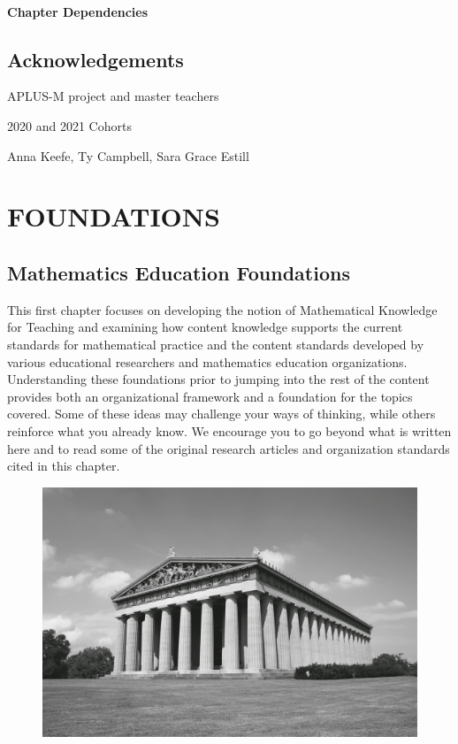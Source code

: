 \documentclass[
]{book}
\theoremstyle{definition}
\theoremstyle{definition}
\theoremstyle{definition}
\theoremstyle{definition}
\theoremstyle{remark}
\begin{document}
\hypertarget{chapter-dependencies}{%
\subsection*{Chapter Dependencies}\label{chapter-dependencies}}

\hypertarget{acknowledgements}{%
\chapter*{Acknowledgements}\label{acknowledgements}}

APLUS-M project and master teachers

2020 and 2021 Cohorts

Anna Keefe, Ty Campbell, Sara Grace Estill

\hypertarget{part-foundations}{%
\part{FOUNDATIONS}\label{part-foundations}}

\hypertarget{MathEdFoundations}{%
\chapter{Mathematics Education Foundations}\label{MathEdFoundations}}

This first chapter focuses on developing the notion of Mathematical Knowledge for Teaching and examining how content knowledge supports the current standards for mathematical practice and the content standards developed by various educational researchers and mathematics education organizations. Understanding these foundations prior to jumping into the rest of the content provides both an organizational framework and a foundation for the topics covered. Some of these ideas may challenge your ways of thinking, while others reinforce what you already know. We encourage you to go beyond what is written here and to read some of the original research articles and organization standards cited in this chapter.

\begin{figure}

{\centering \includegraphics[width=0.7\linewidth]{images/Parthenon_Nashville_bw} 

}

\end{figure}
\end{document}
